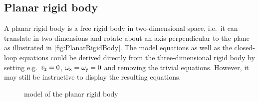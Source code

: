 \subsection{Planar rigid body}\label{sec:CtrlPlanarRigidBody}
A planar rigid body is a free rigid body in two-dimensional space, i.e.\ it can translate in two dimensions and rotate about an axis perpendicular to the plane as illustrated in \autoref{fig:PlanarRigidBody}.
The model equations as well as the closed-loop equations could be derived directly from the three-dimensional rigid body by setting e.g.\ $v_{\mathsf{z}}=0$, $\omega_{\mathsf{x}}=\omega_{\mathsf{y}}=0$ and removing the trivial equations.
However, it may still be instructive to display the resulting equations.

\begin{figure}[ht]
 \centering
 
 \caption{model of the planar rigid body}
 \label{fig:PlanarRigidBody}
\end{figure}

